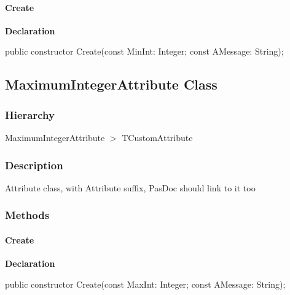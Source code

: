 \documentclass{report}
\begin{document}
\paragraph*{Create}\hspace*{\fill}

\begin{list}{}{
\setlength{\itemindent}{0cm}
\setlength{\listparindent}{0cm}
\setlength{\leftmargin}{\evensidemargin}
\addtolength{\leftmargin}{\tmplength}
\settowidth{\labelsep}{X}
\addtolength{\leftmargin}{\labelsep}
\setlength{\labelwidth}{\tmplength}
}
\begin{flushleft}
\item[\textbf{Declaration}\hfill]
\begin{ttfamily}
public constructor Create(const MinInt: Integer; const AMessage: String);\end{ttfamily}


\end{flushleft}
\end{list}
\subsection*{MaximumIntegerAttribute Class}
\subsubsection*{\large{\textbf{Hierarchy}}\normalsize\hspace{1ex}\hfill}
MaximumIntegerAttribute {$>$} TCustomAttribute
\subsubsection*{\large{\textbf{Description}}\normalsize\hspace{1ex}\hfill}
Attribute class, with Attribute suffix, PasDoc should link to it too\subsubsection*{\large{\textbf{Methods}}\normalsize\hspace{1ex}\hfill}
\paragraph*{Create}\hspace*{\fill}

\begin{list}{}{
\setlength{\itemindent}{0cm}
\setlength{\listparindent}{0cm}
\setlength{\leftmargin}{\evensidemargin}
\addtolength{\leftmargin}{\tmplength}
\settowidth{\labelsep}{X}
\addtolength{\leftmargin}{\labelsep}
\setlength{\labelwidth}{\tmplength}
}
\begin{flushleft}
\item[\textbf{Declaration}\hfill]
\begin{ttfamily}
public constructor Create(const MaxInt: Integer; const AMessage: String);\end{ttfamily}


\end{flushleft}
\end{list}
\end{document}
